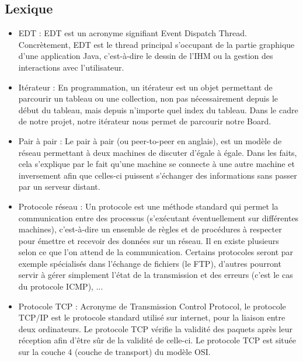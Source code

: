 \newpage
\begin{appendices}
\section{Lexique}
\begin{itemize}
	\item EDT :
	EDT est un acronyme signifiant Event Dispatch Thread. Concrètement, EDT est le thread principal s'occupant de la partie graphique d'une application Java, c'est-à-dire le dessin de l'IHM ou la gestion des interactions avec l'utilisateur.
	\newline

	\item Itérateur :
	En programmation, un itérateur est un objet permettant de parcourir un tableau ou une collection, non pas nécessairement depuis le début du tableau, mais depuis n'importe quel index du tableau. Dans le cadre de notre projet, notre itérateur nous permet de parcourir notre Board.
	\newline

	\item Pair à pair :
    Le pair à  pair (ou peer-to-peer en anglais), est un modèle de réseau permettant à deux machines de discuter d'égale à égale.
    Dans les faits, cela s'explique par le fait qu'une machine se connecte à une autre machine et inversement afin que celles-ci puissent s'échanger des informations sans passer par un serveur distant.
    \newline
    
   	\item Protocole réseau :
    Un protocole est une méthode standard qui permet la communication entre des processus (s'exécutant éventuellement sur différentes machines), c'est-à-dire un ensemble de règles et de procédures à respecter pour émettre et recevoir des données sur un réseau. 
    Il en existe plusieurs selon ce que l'on attend de la communication. Certains protocoles seront par exemple spécialisés dans l'échange de fichiers (le FTP), d'autres pourront servir à gérer simplement l'état de la transmission et des erreurs (c'est le cas du protocole ICMP), ... 
	\newline

	\item Protocole TCP : 
    Acronyme de Transmission Control Protocol, le protocole TCP/IP est le protocole standard utilisé sur internet, pour la liaison entre deux ordinateurs.
    Le protocole TCP vérifie la validité des paquets après leur réception afin d'être sûr de la validité de celle-ci.
    Le protocole TCP est située sur la couche 4 (couche de transport) du modèle OSI. 
	\newline
	

\end{itemize}
\end{appendices}
